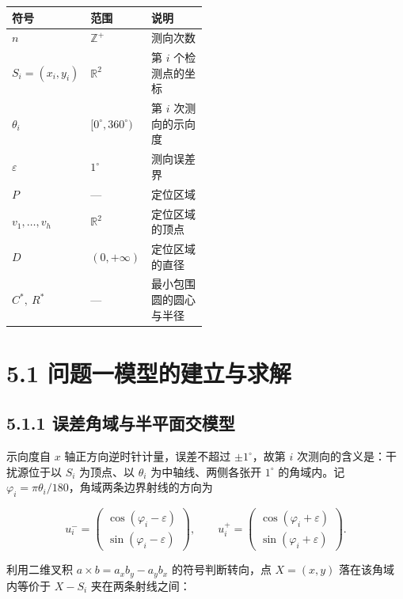 \documentclass[UTF8,a4paper,zihao=-4,fontset=fandol]{ctexart}
\begin{document}
\begin{center}
\renewcommand{\arraystretch}{1.3}
\begin{tabularx}{0.98\linewidth}{>{\centering\arraybackslash}p{0.25\linewidth}>{\centering\arraybackslash}p{0.24\linewidth}>{\centering\arraybackslash}X}
\toprule
\textbf{符号} & \textbf{范围} & \textbf{说明} \\
\midrule
$n$ & $\mathbb{Z}^+$ & 测向次数 \\
$S_i=(x_i,y_i)$ & $\mathbb{R}^2$ & 第 $i$ 个检测点的坐标 \\
$\theta_i$ & $[0^\circ,360^\circ)$ & 第 $i$ 次测向的示向度 \\
$\varepsilon$ & $1^\circ$ & 测向误差界 \\
$P$ & --- & 定位区域 \\
$v_1,\dots,v_h$ & $\mathbb{R}^2$ & 定位区域的顶点 \\
$D$ & $(0,+\infty)$ & 定位区域的直径 \\
$C^*,\ R^*$ & --- & 最小包围圆的圆心与半径 \\
\bottomrule
\end{tabularx}
\end{center}

\section*{5.1 问题一模型的建立与求解}

\subsection*{5.1.1 误差角域与半平面交模型}

示向度自 $x$ 轴正方向逆时针计量，误差不超过 $\pm 1^\circ$，故第 $i$ 次测向的含义是：干扰源位于以 $S_i$ 为顶点、以 $\theta_i$ 为中轴线、两侧各张开 $1^\circ$ 的角域内。记 $\varphi_i=\pi\theta_i/180$，角域两条边界射线的方向为

\[
u_i^-=\begin{pmatrix}\cos(\varphi_i-\varepsilon)\\ \sin(\varphi_i-\varepsilon)\end{pmatrix},\qquad
u_i^+=\begin{pmatrix}\cos(\varphi_i+\varepsilon)\\ \sin(\varphi_i+\varepsilon)\end{pmatrix}.
\]

利用二维叉积 $a\times b=a_xb_y-a_yb_x$ 的符号判断转向，点 $X=(x,y)$ 落在该角域内等价于 $X-S_i$ 夹在两条射线之间：
\end{document}
